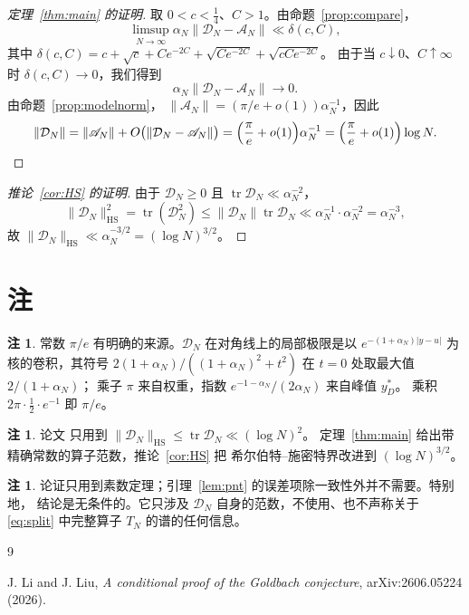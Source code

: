 \documentclass[12pt,a4paper]{amsart}
\numberwithin{equation}{section}
\theoremstyle{plain}
\theoremstyle{definition}
\newtheorem{remark}[theorem]{注}
\newcommand{\HS}{\mathrm{HS}}
\begin{document}
\begin{proof}[定理~\ref{thm:main} 的证明]
取 $0<c<\frac14$、$C>1$。由命题~\ref{prop:compare}，
\[
 \limsup_{N\to\infty}\alpha_N\|\mathcal D_N-\mathscr A_N\|\ll\delta(c,C),
\]
其中 $\delta(c,C)=c+\sqrt c+Ce^{-2C}+\sqrt{Ce^{-2C}}+\sqrt{cCe^{-2C}}$。
由于当 $c\downarrow0$、$C\uparrow\infty$ 时 $\delta(c,C)\to0$，我们得到
\[
 \alpha_N\|\mathcal D_N-\mathscr A_N\|\longrightarrow0 .
\]
由命题~\ref{prop:modelnorm}，
$\|\mathscr A_N\|=(\pi/e+o(1))\alpha_N^{-1}$，因此
\[
 \|\mathcal D_N\|=\|\mathscr A_N\|+O\bigl(\|\mathcal D_N-\mathscr A_N\|\bigr)
 =\Bigl(\frac{\pi}{e}+o(1)\Bigr)\alpha_N^{-1}
 =\Bigl(\frac{\pi}{e}+o(1)\Bigr)\log N .
\]
\end{proof}

\begin{proof}[推论~\ref{cor:HS} 的证明]
由于 $\mathcal D_N\ge0$ 且 $\operatorname{tr}\mathcal D_N\ll\alpha_N^{-2}$，
\[
 \|\mathcal D_N\|_{\HS}^2=\operatorname{tr}(\mathcal D_N^2)
 \le\|\mathcal D_N\|\operatorname{tr}\mathcal D_N
 \ll\alpha_N^{-1}\cdot\alpha_N^{-2}=\alpha_N^{-3},
\]
故 $\|\mathcal D_N\|_{\HS}\ll\alpha_N^{-3/2}=(\log N)^{3/2}$。
\end{proof}

\section{注}\label{sec:remarks}

\begin{remark}\label{rem:constant}
常数 $\pi/e$ 有明确的来源。$\mathscr D_N$ 在对角线上的局部极限是以
$e^{-(1+\alpha_N)|y-u|}$ 为核的卷积，其符号
$2(1+\alpha_N)/((1+\alpha_N)^2+t^2)$ 在 $t=0$ 处取最大值 $2/(1+\alpha_N)$；
乘子 $\pi$ 来自权重，指数 $e^{-1-\alpha_N}/(2\alpha_N)$ 来自峰值 $y_D^*$。
乘积 $2\pi\cdot\frac12\cdot e^{-1}$ 即 $\pi/e$。
\end{remark}

\begin{remark}\label{rem:vsLL}
论文 \cite[命题 6.5]{LL} 只用到
$\|\mathcal D_N\|_{\HS}\le\operatorname{tr}\mathcal D_N\ll(\log N)^2$。
定理~\ref{thm:main} 给出带精确常数的算子范数，推论~\ref{cor:HS} 把
希尔伯特--施密特界改进到 $(\log N)^{3/2}$。
\end{remark}

\begin{remark}\label{rem:limitation}
论证只用到素数定理；引理~\ref{lem:pnt} 的误差项除一致性外并不需要。特别地，
结论是无条件的。它只涉及 $\mathcal D_N$ 自身的范数，不使用、也不声称关于
\eqref{eq:split} 中完整算子 $T_N$ 的谱的任何信息。
\end{remark}

\begin{thebibliography}{9}

J. Li and J. Liu,
\emph{A conditional proof of the Goldbach conjecture},
arXiv:2606.05224 (2026).

\end{thebibliography}
\end{document}

